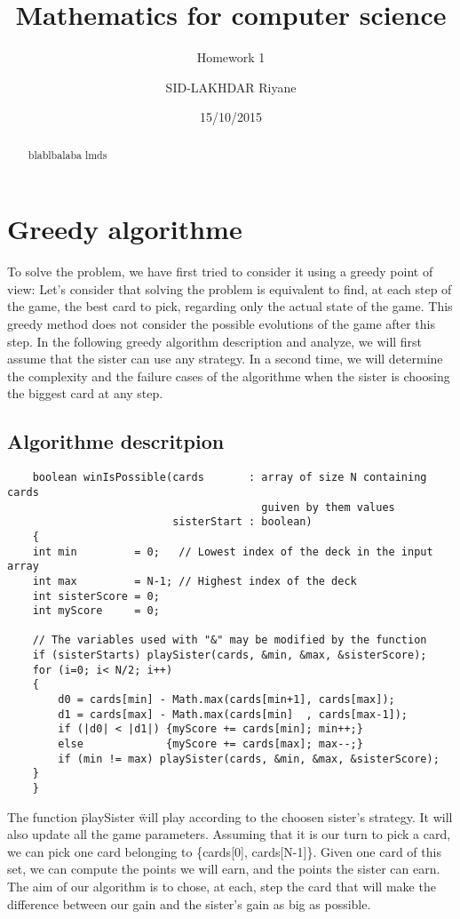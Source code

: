\documentclass[a4paper,10pt]{article}
\title{Mathematics for computer science}
\subtitle{Homework 1}
\author{SID-LAKHDAR Riyane}
\date{15/10/2015}
\begin{document}


\maketitle

\begin{abstract}
  blablbalaba
  lmds
  
\end{abstract}


\section{Greedy algorithme}
    To solve the problem, we have first tried to consider it using a greedy point of view:\newline
    Let's consider that solving the problem is equivalent to find, at each step of the game, the best card to pick, regarding only the actual state of the game.
    This greedy method does not consider the possible evolutions of the game after this step.\newline
    In the following greedy algorithm description and analyze, we will first assume that the sister can use any strategy.   In a second time, we will determine the complexity and the failure cases of the algorithme when the sister is choosing the biggest card at any step.
    \subsection{Algorithme descritpion}
    \begin{lstlisting}
    boolean winIsPossible(cards       : array of size N containing cards
                                        guiven by them values
                          sisterStart : boolean)
    {
	int min         = 0;   // Lowest index of the deck in the input array
	int max         = N-1; // Highest index of the deck
	int sisterScore = 0;
	int myScore     = 0;

	// The variables used with "&" may be modified by the function
	if (sisterStarts) playSister(cards, &min, &max, &sisterScore);
	for (i=0; i< N/2; i++)
	{
	    d0 = cards[min] - Math.max(cards[min+1], cards[max]);
	    d1 = cards[max] - Math.max(cards[min]  , cards[max-1]);
	    if (|d0| < |d1|) {myScore += cards[min]; min++;}
	    else             {myScore += cards[max]; max--;}
	    if (min != max) playSister(cards, &min, &max, &sisterScore);
	}
    }
    \end{lstlisting}
    The function \" playSister \" will play according to the choosen sister's strategy.  It will also update all the game parameters.\newline
    Assuming that it is our turn to pick a card, we can pick one card belonging to \{cards[0], cards[N-1]\}.
    Given one card of this set, we can compute the points we will earn, and the points the sister can earn.
    The aim of our algorithm is to chose, at each, step the card that will make the difference between our gain and the sister's gain as big as possible.\newline
\end{document}
